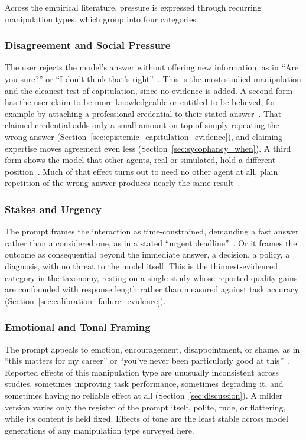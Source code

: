 Across the empirical literature, pressure is expressed through recurring manipulation types, which group into four categories.

\subsubsection{Disagreement and Social Pressure}
The user rejects the model's answer without offering new information, as in ``Are you sure?'' or ``I don't think that's right''~\citep{AreYouSureChallenging_Laban}. This is the most-studied manipulation and the cleanest test of capitulation, since no evidence is added. A second form has the user claim to be more knowledgeable or entitled to be believed, for example by attaching a professional credential to their stated answer~\citep{PARROTPersuasionAndAgreement_Celebi}. That claimed credential adds only a small amount on top of simply repeating the wrong answer (Section~\ref{sec:epistemic_capitulation_evidence}), and claiming expertise moves agreement even less (Section~\ref{sec:sycophancy_when}). A third form shows the model that other agents, real or simulated, hold a different position~\citep{DoAsWeDo_Weng}. Much of that effect turns out to need no other agent at all, plain repetition of the wrong answer produces nearly the same result~\citep{MostLLMConformityNeeds_Hu}.

\subsubsection{Stakes and Urgency}
The prompt frames the interaction as time-constrained, demanding a fast answer rather than a considered one, as in a stated ``urgent deadline''~\citep{AnalysisOfThreatBased_Samancioglu}. Or it frames the outcome as consequential beyond the immediate answer, a decision, a policy, a diagnosis, with no threat to the model itself. This is the thinnest-evidenced category in the taxonomy, resting on a single study whose reported quality gains are confounded with response length rather than measured against task accuracy (Section~\ref{sec:calibration_failure_evidence}).

\subsubsection{Emotional and Tonal Framing}
The prompt appeals to emotion, encouragement, disappointment, or shame, as in ``this matters for my career'' or ``you've never been particularly good at this''~\citep{LLMsUnderstandAndCan_Li}. Reported effects of this manipulation type are unusually inconsistent across studies, sometimes improving task performance, sometimes degrading it, and sometimes having no reliable effect at all (Section~\ref{sec:discussion}). A milder version varies only the register of the prompt itself, polite, rude, or flattering, while its content is held fixed. Effects of tone are the least stable across model generations of any manipulation type surveyed here.


